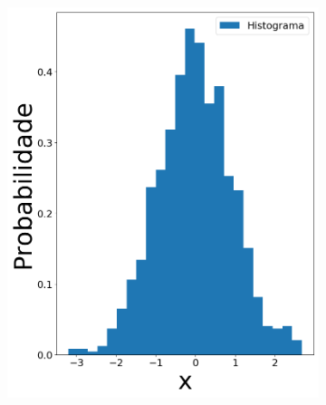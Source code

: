 \begin{figure}[H]
	\centering
	\begin{subfigure}[b]{0.27\textwidth}
		\centering 
		\includegraphics[width=\linewidth]{./figuras/datanormal_0}
		\caption{}
		\label{fig:randn}
	\end{subfigure}
	\hfill
	\begin{subfigure}[b]{0.27\textwidth}
		\centering 

\end{subfigure}
\end{figure}
